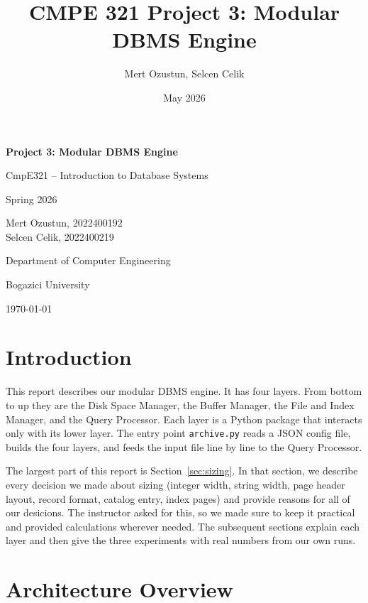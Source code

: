 \documentclass[12pt]{article}
\title{CMPE 321 Project 3: Modular DBMS Engine}
\author{Mert Ozustun, Selcen Celik}
\date{May 2026}
\begin{document}
\begin{titlepage}
    \centering
    \vspace*{3cm}

    {\LARGE \textbf{Project 3: Modular DBMS Engine}\par}
    \vspace{0.5cm}
    {\Large CmpE321 -- Introduction to Database Systems \par}
    {\Large Spring 2026\par}

    \vspace{2cm}

    {\large
    Mert Ozustun, 2022400192 \\
    Selcen Celik, 2022400219
    \par}

    \vspace{1cm}

    {\large Department of Computer Engineering \par}
    {\large Bogazici University \par}

    \vspace{1cm}
    {\large \today \par}
\end{titlepage}

\section{Introduction}

This report describes our modular DBMS engine. It has four layers.
From bottom to up they are the Disk Space Manager, the Buffer Manager, the
File and Index Manager, and the Query Processor. Each layer is a Python
package that interacts only with its lower layer. The entry point
\texttt{archive.py} reads a JSON config file, builds the four layers, and
feeds the input file line by line to the Query Processor.

The largest part of this report is Section~\ref{sec:sizing}. In that section, we describe every decision we made about sizing (integer width, string width, page header layout,
record format, catalog entry, index pages) and provide reasons for all of our desicions.
The instructor asked for this, so we made sure to keep it practical and provided 
calculations wherever needed. The subsequent sections explain each layer and then give the three
experiments with real numbers from our own runs.

\section{Architecture Overview}
\end{document}
